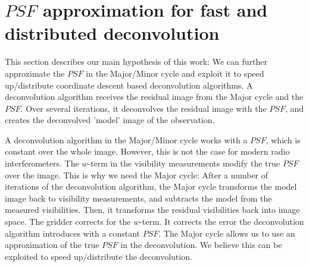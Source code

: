 \section{$PSF$ approximation for fast and distributed deconvolution} \label{gradients}
This section describes our main hypothesis of this work: We can further approximate the $PSF$ in the Major/Minor cycle and exploit it to speed up/distribute coordinate descent based deconvolution algorithms. A deconvolution algorithm receives the residual image from the Major cycle and the $PSF$. Over several iterations, it deconvolves the residual image with the $PSF$, and creates the deconvolved 'model' image of the observation.

A deconvolution algorithm in the Major/Minor cycle works with a $PSF$, which is constant over the whole image. However, this is not the case for modern radio interferometers. The $w$-term in the visibility measurements modify the true $PSF$ over the image. This is why we need the Major cycle: After a number of iterations of the deconvolution algorithm, the Major cycle transforms the model image back to visibility measurements, and subtracts the model from the measured visibilities. Then, it transforms the residual visibilities back into image space. The gridder corrects for the $w$-term. It corrects the error the deconvolution algorithm introduces with a constant $PSF$. The Major cycle allows us to use an approximation of the true $PSF$ in the deconvolution. We believe this can be exploited to speed up/distribute the deconvolution.

